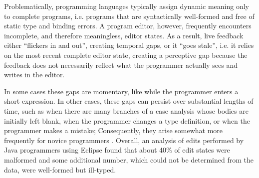 %
Problematically,
programming languages typically assign dynamic meaning only to {complete programs}, i.e. programs that are syntactically well-formed and free of static type and binding errors. A program editor, however, frequently encounters incomplete, and therefore meaningless, editor states. As a result, live feedback either ``flickers in and out'', creating temporal gaps, or it ``goes stale'', i.e. it relies on the most recent complete editor state, creating a perceptive gap because the feedback does not necessarily reflect what the programmer
%
actually sees and writes in the editor.

In some cases these gaps are momentary, like while the programmer
enters
a short expression. In other cases, these gaps can persist over substantial lengths of time, such as when there are many branches of a case analysis whose bodies are initially left blank, when the programmer changes a type definition, or when the programmer makes a mistake;
Consequently, they arise somewhat more frequently for novice programmers \cite{mccauley2008debugging,fitzgerald2008debugging}.
%
Overall, an analysis of edits performed by Java programmers using Eclipse found that about 40\% of edit states were malformed \cite{popl-paper,6883030} and some additional number, which could not be determined from the data, were well-formed but ill-typed.


